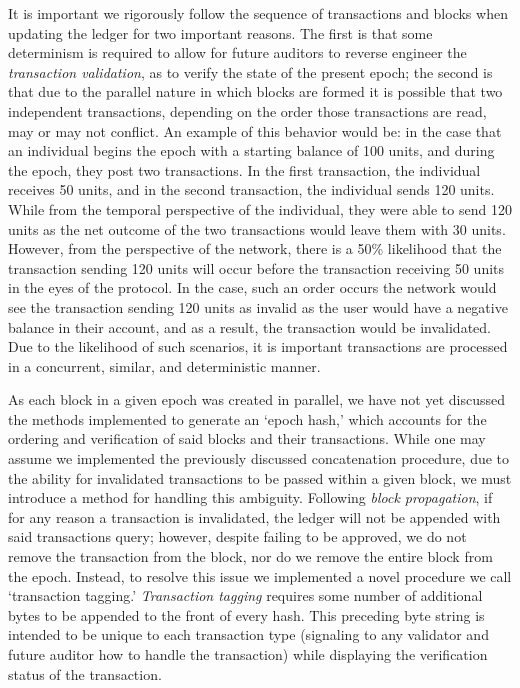 It is important we rigorously follow the sequence of transactions and blocks when updating the ledger for two important reasons. The first is that some determinism is required to allow for future auditors to reverse engineer the \textit{transaction validation}, as to verify the state of the present epoch; the second is that due to the parallel nature in which blocks are formed it is possible that two independent transactions, depending on the order those transactions are read, may or may not conflict. An example of this behavior would be: in the case that an individual begins the epoch with a starting balance of 100 units, and during the epoch, they post two transactions. In the first transaction, the individual receives 50 units, and in the second transaction, the individual sends 120 units. While from the temporal perspective of the individual, they were able to send 120 units as the net outcome of the two transactions would leave them with 30 units. However, from the perspective of the network, there is a 50\% likelihood that the transaction sending 120 units will occur before the transaction receiving 50 units in the eyes of the protocol. In the case, such an order occurs the network would see the transaction sending 120 units as invalid as the user would have a negative balance in their account, and as a result, the transaction would be invalidated. Due to the likelihood of such scenarios, it is important transactions are processed in a concurrent, similar, and deterministic manner.

As each block in a given epoch was created in parallel, we have not yet discussed the methods implemented to generate an ‘epoch hash,’ which accounts for the ordering and verification of said blocks and their transactions. While one may assume we implemented the previously discussed concatenation procedure, due to the ability for invalidated transactions to be passed within a given block, we must introduce a method for handling this ambiguity. Following \textit{block propagation}, if for any reason a transaction is invalidated, the ledger will not be appended with said transactions query; however, despite failing to be approved, we do not remove the transaction from the block, nor do we remove the entire block from the epoch. Instead, to resolve this issue we implemented a novel procedure we call ‘transaction tagging.’ \textit{Transaction tagging} requires some number of additional bytes to be appended to the front of every hash. This preceding byte string is intended to be unique to each transaction type (signaling to any validator and future auditor how to handle the transaction) while displaying the verification status of the transaction.

